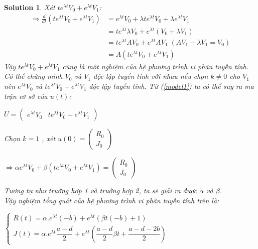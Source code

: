 \documentclass[a4paper]{article}
\newtheorem*{sol}{Solution}
\begin{document}
\begin{sol}
Xét $te^{\lambda t} V_0 + e^{\lambda t} V_1$: \\
\begin{align*}
    \Rightarrow \frac{d}{dt}(te^{\lambda t} V_0 + e^{\lambda t} V_1)&=e^{\lambda t}V_0+\lambda t e^{\lambda t}V_0+ \lambda e^{\lambda t}V_1\\
&= t e^{\lambda t} \lambda V_0+ e^{\lambda t}(V_0+\lambda V_1)\\
&= t e^{\lambda t}AV_0+e^{\lambda t}AV_1\; (AV_1-\lambda V_1=V_0)\\
&= A(t e^{\lambda t}V_0+e^{\lambda t}V_1)
\end{align*}
Vậy $te^{\lambda t} V_0 + e^{\lambda t} V_1$ cũng là một nghiệm của hệ phương trình vi phân tuyến tính.\\
Có thể chứng minh $V_0$ và $V_1$ độc lập tuyến tính với nhau nếu chọn $k \neq 0$ cho $V_1$ nên $e^{\lambda t} V_0$ và $te^{\lambda t} V_0 + e^{\lambda t} V_1$ độc lập tuyến tính.
Từ (\ref{model1}) ta có thể suy ra ma trận cơ sở của $u(t)$:\\
\begin{center}
    $U=\begin{pmatrix}
        e^{\lambda t}V_0 & te^{\lambda t}V_0+e^{\lambda t}V_1
    \end{pmatrix}$
\end{center}
Chọn $k=1$ , xét $u(0)= \begin{pmatrix}
    R_0 \\ J_0
\end{pmatrix}$ \\
\begin{center}
    $\Rightarrow \alpha e^{\lambda t} V_0 + \beta (te^{\lambda t}V_0+e^{\lambda t}V_1)= \begin{pmatrix}
R_0\\ J_0 
\end{pmatrix}$
\end{center}
Tương tự như trường hợp 1 và trường hợp 2, ta sẽ giải ra được $\alpha$ và $\beta$.\\
Vậy nghiệm tổng quát của hệ phương trình vi phân tuyến tính trên là:
\begin{center}
    $\left\{\begin{matrix}
R(t)=\alpha. e^{\lambda t}(-b)+e^{\lambda t}(\beta t(-b)+1)\\ 
J(t)=\alpha.e^{\lambda t}\dfrac{a-d}{2}+e^{\lambda t}\left(\dfrac{a - d}{2}\beta t+\dfrac{a-d-2b}{2}\right)
\end{matrix}\right.$
\end{center}

\end{sol}
\end{document}
